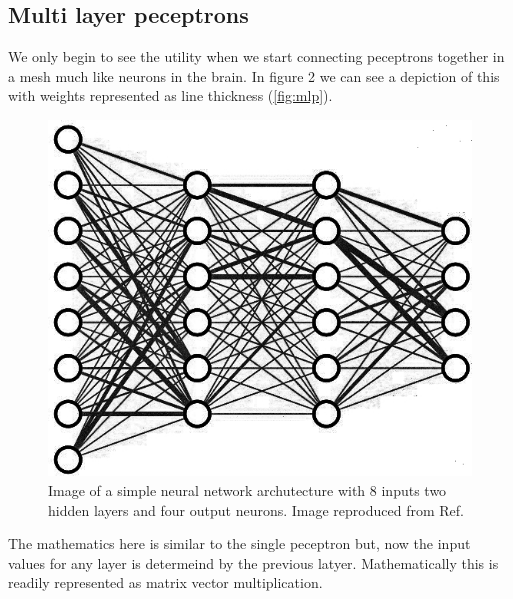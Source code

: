 \documentclass{article}
\begin{document}
\subsection{Multi layer peceptrons}
\label{sec:mlp}
We only begin to see the utility when we start connecting peceptrons together in a mesh much like neurons in the brain. In figure 2 we can see a depiction of this with weights represented as line thickness (\autoref{fig:mlp}). 
\begin{figure}[H]
\caption{Image of a simple neural network archutecture with 8 inputs two hidden layers and four output neurons. Image reproduced from Ref.\cite{3blue1brown}}
\label{fig:mlp}
\includegraphics[scale=2]{nn.jpg}
\end{figure}
The mathematics here is similar to the single peceptron but, now the input values for any layer is determeind by the previous latyer. Mathematically this is readily represented as matrix vector multiplication. 
\end{document}
